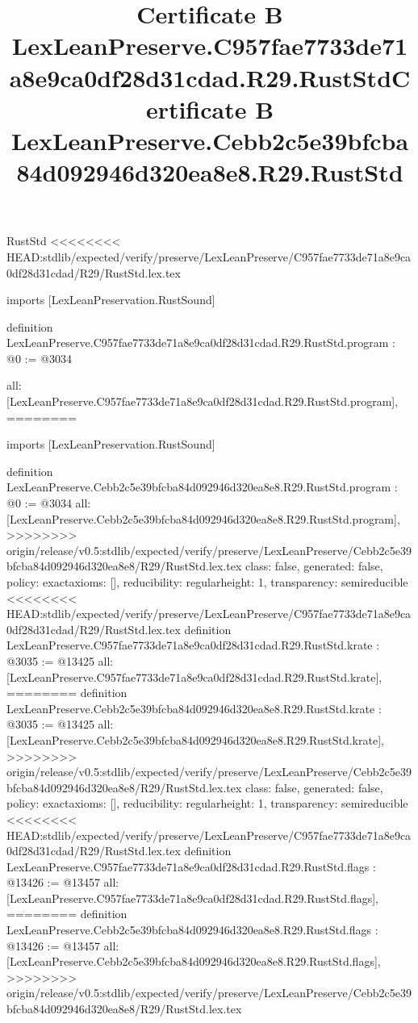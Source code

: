 \begin{lexlean}{RustStd}
<<<<<<<< HEAD:stdlib/expected/verify/preserve/LexLeanPreserve/C957fae7733de71a8e9ca0df28d31cdad/R29/RustStd.lex.tex
\title{Certificate B LexLeanPreserve.C957fae7733de71a8e9ca0df28d31cdad.R29.RustStd}
\begin{coremodule}
imports [LexLeanPreservation.RustSound]

definition LexLeanPreserve.C957fae7733de71a8e9ca0df28d31cdad.R29.RustStd.program : @0 := @3034 {
  all: [LexLeanPreserve.C957fae7733de71a8e9ca0df28d31cdad.R29.RustStd.program],
========
\title{Certificate B LexLeanPreserve.Cebb2c5e39bfcba84d092946d320ea8e8.R29.RustStd}
\begin{coremodule}
imports [LexLeanPreservation.RustSound]

definition LexLeanPreserve.Cebb2c5e39bfcba84d092946d320ea8e8.R29.RustStd.program : @0 := @3034 {
  all: [LexLeanPreserve.Cebb2c5e39bfcba84d092946d320ea8e8.R29.RustStd.program],
>>>>>>>> origin/release/v0.5:stdlib/expected/verify/preserve/LexLeanPreserve/Cebb2c5e39bfcba84d092946d320ea8e8/R29/RustStd.lex.tex
  class: false,
  generated: false,
  policy: exact{axioms: []},
  reducibility: regular{height: 1},
  transparency: semireducible
}
<<<<<<<< HEAD:stdlib/expected/verify/preserve/LexLeanPreserve/C957fae7733de71a8e9ca0df28d31cdad/R29/RustStd.lex.tex
definition LexLeanPreserve.C957fae7733de71a8e9ca0df28d31cdad.R29.RustStd.krate : @3035 := @13425 {
  all: [LexLeanPreserve.C957fae7733de71a8e9ca0df28d31cdad.R29.RustStd.krate],
========
definition LexLeanPreserve.Cebb2c5e39bfcba84d092946d320ea8e8.R29.RustStd.krate : @3035 := @13425 {
  all: [LexLeanPreserve.Cebb2c5e39bfcba84d092946d320ea8e8.R29.RustStd.krate],
>>>>>>>> origin/release/v0.5:stdlib/expected/verify/preserve/LexLeanPreserve/Cebb2c5e39bfcba84d092946d320ea8e8/R29/RustStd.lex.tex
  class: false,
  generated: false,
  policy: exact{axioms: []},
  reducibility: regular{height: 1},
  transparency: semireducible
}
<<<<<<<< HEAD:stdlib/expected/verify/preserve/LexLeanPreserve/C957fae7733de71a8e9ca0df28d31cdad/R29/RustStd.lex.tex
definition LexLeanPreserve.C957fae7733de71a8e9ca0df28d31cdad.R29.RustStd.flags : @13426 := @13457 {
  all: [LexLeanPreserve.C957fae7733de71a8e9ca0df28d31cdad.R29.RustStd.flags],
========
definition LexLeanPreserve.Cebb2c5e39bfcba84d092946d320ea8e8.R29.RustStd.flags : @13426 := @13457 {
  all: [LexLeanPreserve.Cebb2c5e39bfcba84d092946d320ea8e8.R29.RustStd.flags],
>>>>>>>> origin/release/v0.5:stdlib/expected/verify/preserve/LexLeanPreserve/Cebb2c5e39bfcba84d092946d320ea8e8/R29/RustStd.lex.tex
}}}
\end{coremodule}}
\end{coremodule}
\end{lexlean}

